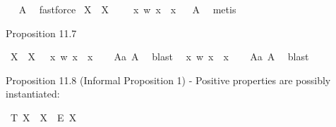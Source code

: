 \begin{isabellebody}
\isadelimproof
\ %
\endisadelimproof
%
\isatagproof
{}\isamarkupfalse%
\ A{}\ \isamarkupfalse%
\ fastforce%
\endisatagproof
{\isafoldproof}%
%
\isadelimproof
%
\endisadelimproof
\isanewline
{}\isamarkupfalse%
\ {\isachardoublequoteopen}{\isasymlfloor}{\isacharparenleft}\isactrlbold {\isasymexists}X{\isachardot}\ {\isasymP}\ X{\isacharparenright}\ \isactrlbold {\isasymrightarrow}\ \ {\isasymP}\ {\isacharparenleft}\isactrlbold {\isasymrightharpoondown}\ {\isacharparenleft}{\isasymlambda}x\ w{\isachardot}\ {\isasymnot}x\ {\isacharequal}\ x{\isacharparenright}{\isacharparenright}{\isasymrfloor}{\isachardoublequoteclose}%
\isadelimproof
\ %
\endisadelimproof
%
\isatagproof
{}\isamarkupfalse%
\ A{}\ \isamarkupfalse%
\ metis%
\endisatagproof
{\isafoldproof}%
%
\isadelimproof
%
\endisadelimproof
%
\begin{isamarkuptext}%
Proposition 11.7%
\end{isamarkuptext}\isamarkuptrue%
\isamarkupfalse%
\ {\isachardoublequoteopen}{\isasymlfloor}{\isacharparenleft}\isactrlbold {\isasymexists}X{\isachardot}\ {\isasymP}\ X{\isacharparenright}\ \isactrlbold {\isasymrightarrow}\ \isactrlbold {\isasymnot}{\isasymP}\ {\isacharparenleft}{\isacharparenleft}{\isasymlambda}x\ w{\isachardot}\ {\isasymnot}x\ {\isacharequal}\ x{\isacharparenright}{\isacharparenright}{\isasymrfloor}{\isachardoublequoteclose}%
\isadelimproof
\ \ %
\endisadelimproof
%
\isatagproof
{}\isamarkupfalse%
\ A{}a\ A{}\ \isamarkupfalse%
\ blast%
\endisatagproof
{\isafoldproof}%
%
\isadelimproof
%
\endisadelimproof
\isanewline
{}\isamarkupfalse%
\ {\isachardoublequoteopen}{\isasymlfloor}\isactrlbold {\isasymnot}{\isasymP}\ {\isacharparenleft}{\isasymlambda}x\ w{\isachardot}\ {\isasymnot}x\ {\isacharequal}\ x{\isacharparenright}{\isasymrfloor}{\isachardoublequoteclose}%
\isadelimproof
\ \ %
\endisadelimproof
%
\isatagproof
{}\isamarkupfalse%
\ A{}a\ A{}\ \isamarkupfalse%
\ blast%
\endisatagproof
{\isafoldproof}%
%
\isadelimproof
%
\endisadelimproof
%
\begin{isamarkuptext}%
Proposition 11.8 (Informal Proposition 1) - Positive properties are possibly instantiated:%
\end{isamarkuptext}\isamarkuptrue%
\isamarkupfalse%
\ T{}{\isacharcolon}\ {\isachardoublequoteopen}{\isasymlfloor}\isactrlbold {\isasymforall}X{\isachardot}\ {\isasymP}\ X\ \isactrlbold {\isasymrightarrow}\ \isactrlbold {\isasymdiamond}\isactrlbold {\isasymexists}\isactrlsup E\ X{\isasymrfloor}{\isachardoublequoteclose}%

\end{isabellebody}
